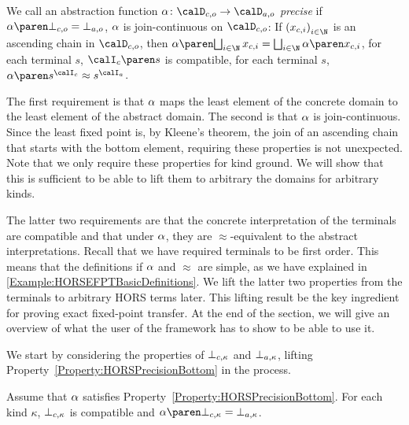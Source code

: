 \documentclass[../../diss.tex]{subfiles}
\begin{document}
\begin{definition}%
\label{Definition:HORSEFPTPrecise}%
    We call an abstraction function $\abs \colon \domainc{\ground} \to \domaina{\ground}$ \emph{precise} if
     $\abs{\botc{\ground}} = \bota{\ground}$,
     $\abs$ is join-continuous on $\domainc{\ground}$:
            If ${(\xci)}_{i \in \N}$ is an ascending chain in $\domainc{\ground}$, then $\abs{\bigsqcup_{i \in \N} \xci} = \bigsqcup_{i \in \N} \abs{\xci}$,
     for each terminal $s$, $\interpretationc{s}$ is compatible,
     for each terminal $s$, $\abs{s^{\interpretationc}} \approx s^{\interpretationa}$.
\end{definition}

The first requirement is that $\abs$ maps the least element of the concrete domain to the least element of the abstract domain.
The second is that $\abs$ is join-continuous.
Since the least fixed point is, by Kleene's theorem, the join of an ascending chain that starts with the bottom element, requiring these properties is not unexpected.
Note that we only require these properties for kind ground.
We will show that this is sufficient to be able to lift them to arbitrary the domains for arbitrary kinds.

The latter two requirements are that the concrete interpretation of the terminals are compatible and that under $\abs$, they are $\approx$-equivalent to the abstract interpretations.
Recall that we have required terminals to be first order.
This means that the definitions if $\abs$ and $\approx$ are simple, as we have explained in \cref{Example:HORSEFPTBasicDefinitions}.
We lift the latter two properties from the terminals to arbitrary HORS terms later.
This lifting result be the key ingredient for proving exact fixed-point transfer.
At the end of the section, we will give an overview of what the user of the framework has to show to be able to use it.

We start by considering the properties of $\botc{\kappa}$ and $\bota{\kappa}$, lifting Property~\ref{Property:HORSPrecisionBottom} in the process.

\begin{lemma}%
\label{Lemma:HORSEFPTLiftBottom}%
    Assume that $\abs$ satisfies Property~\ref{Property:HORSPrecisionBottom}.
    For each kind $\kappa$, $\botc{\kappa}$ is compatible and $\abs{\botc{\kappa}} = \bota{\kappa}$.
\end{lemma}
\end{document}
